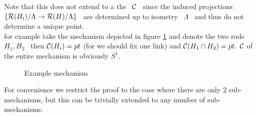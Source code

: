 Note that this does not extend to a the \cspace \ $\mathcal{C}$ \ since the
induced projections \ $\{\mathcal{R}(H_{i})/\Lambda \rightarrow
\mathcal{R}(H)/\Lambda\}$ \ are determined up to isometry \ $\Lambda$ \ and
thus do not determine a unique point. \\
for example take the mechanism depicted in figure \ref{mech} and
denote the two rods $H_1,H_2$ \ then $\mathcal{C}(H_i)=pt$ (for we should
fix one link) and
$\mathcal{C}(H_1\cap H_2)=pt.$ $\mathcal{C}$ of the entire mechanism is obviously $S^1$.\\
\begin{figure}[h]
\label{mech} \centering
\epsfysize=6cm %
\leavevmode {} \caption{Example
mechanism}
\end{figure}
For convenience we restrict the proof to the case where there are
only $2$ sub-mechanisms, but this can be trivially extended to any
number of sub-mechanisms:
